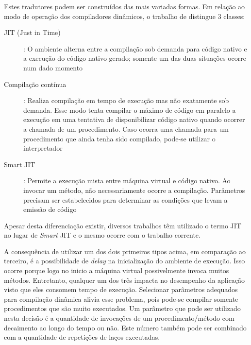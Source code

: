 Estes tradutores podem ser construídos das mais variadas formas.
Em relação ao modo de operação dos compiladores dinâmicos, o trabalho
de  distingue 3 classes:
\begin{description}
  \item[JIT (Just in Time)]: O ambiente alterna entre a compilação sob
    demanda para código nativo e a execução do código nativo gerado;
    somente um das duas situações ocorre num dado momento
  \item[Compilação contínua]: Realiza compilação em tempo de execução
    mas não exatamente sob demanda. Esse modo tenta compilar o máximo
    de código em paralelo a execução em uma tentativa de disponibilizar
    código nativo quando ocorrer a chamada de um procedimento. Caso
    ocorra uma chamada para um procedimento que ainda tenha sido
    compilado, pode-se utilizar o interpretador
  \item[Smart JIT]: Permite a execução mista entre máquina virtual e
    código nativo. Ao invocar um método, não necessariamente ocorre a
    compilação. Parâmetros precisam ser estabelecidos para determinar
    as condições que levam a emissão de código
\end{description}
Apesar desta diferenciação existir, diversos trabalhos
\cite{suganuma_oopsla_2001}\cite{suganuma_ibm}\cite{judo} têm utilizado o termo
JIT no lugar de \textit{Smart} JIT e o mesmo ocorre com o trabalho
corrente.

A consequência de utilizar um dos dois primeiros tipos acima, em
comparação ao terceiro, é a possibilidade de \textit{delay} na
inicialização do ambiente de execução. Isso ocorre porque logo
no inicio a máquina virtual possivelmente invoca muitos métodos.
Entretanto, qualquer um dos três
impacta no desempenho da aplicação visto que eles consomem tempo
de execução. Selecionar parâmetros adequados para compilação dinâmica
alivia esse problema, pois pode-se compilar somente procedimentos que
são muito executados. Um parâmetro que pode ser utilizado nesta
decisão é a quantidade de invocações de um
procedimento/método com decaimento ao longo do tempo \cite{holzle} ou
não. Este número também pode ser combinado com a quantidade de
repetições de laços executadas.

